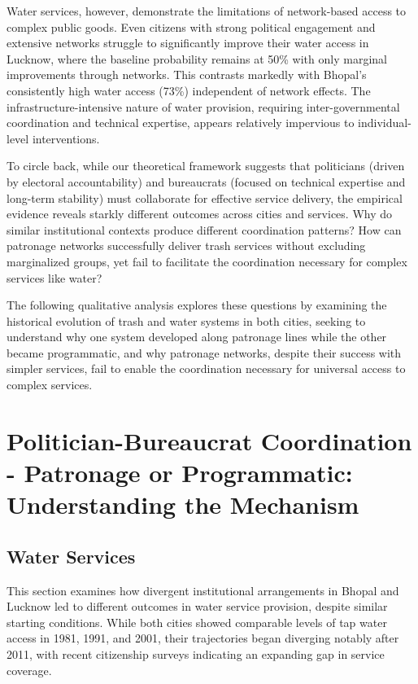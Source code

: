 Water services, however, demonstrate the limitations of network-based access to complex public goods. Even citizens with strong political engagement and extensive networks struggle to significantly improve their water access in Lucknow, where the baseline probability remains at 50\% with only marginal improvements through networks. This contrasts markedly with Bhopal's consistently high water access (73\%) independent of network effects. The infrastructure-intensive nature of water provision, requiring inter-governmental coordination and technical expertise, appears relatively impervious to individual-level interventions.


To circle back, while our theoretical framework suggests that politicians (driven by electoral accountability) and bureaucrats (focused on technical expertise and long-term stability) must collaborate for effective service delivery, the empirical evidence reveals starkly different outcomes across cities and services. Why do similar institutional contexts produce different coordination patterns? How can patronage networks successfully deliver trash services without excluding marginalized groups, yet fail to facilitate the coordination necessary for complex services like water? 

The following qualitative analysis explores these questions by examining the historical evolution of trash and water systems in both cities, seeking to understand why one system developed along patronage lines while the other became programmatic, and why patronage networks, despite their success with simpler services, fail to enable the coordination necessary for universal access to complex services.

\section{Politician-Bureaucrat Coordination - Patronage or Programmatic: Understanding the Mechanism}

\vspace{5mm}

\subsection{Water Services}
This section examines how divergent institutional arrangements in Bhopal and Lucknow led to different outcomes in water service provision, despite similar starting conditions. While both cities showed comparable levels of tap water access in 1981, 1991, and 2001, their trajectories began diverging notably after 2011, with recent citizenship surveys indicating an expanding gap in service coverage.

